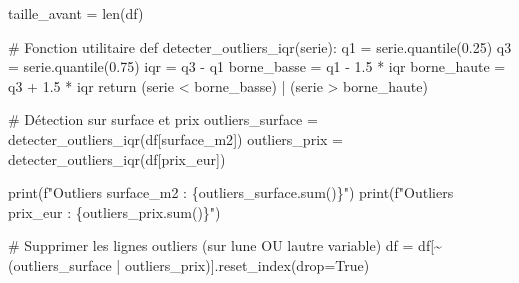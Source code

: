 \documentclass[
  french,
  11pt,
  a4paper,
]{scrbook}
\newenvironment{Shaded}{}{}
\newcommand{\BuiltInTok}[1]{\textcolor[rgb]{0.84,0.23,0.29}{#1}}
\newcommand{\CommentTok}[1]{\textcolor[rgb]{0.42,0.45,0.49}{#1}}
\newcommand{\ControlFlowTok}[1]{\textcolor[rgb]{0.84,0.23,0.29}{#1}}
\newcommand{\FloatTok}[1]{\textcolor[rgb]{0.00,0.36,0.77}{#1}}
\newcommand{\KeywordTok}[1]{\textcolor[rgb]{0.84,0.23,0.29}{#1}}
\newcommand{\NormalTok}[1]{\textcolor[rgb]{0.14,0.16,0.18}{#1}}
\newcommand{\OperatorTok}[1]{\textcolor[rgb]{0.14,0.16,0.18}{#1}}
\newcommand{\SpecialCharTok}[1]{\textcolor[rgb]{0.00,0.36,0.77}{#1}}
\newcommand{\SpecialStringTok}[1]{\textcolor[rgb]{0.01,0.18,0.38}{#1}}
\newcommand{\StringTok}[1]{\textcolor[rgb]{0.01,0.18,0.38}{#1}}
\newcommand{\VariableTok}[1]{\textcolor[rgb]{0.89,0.38,0.04}{#1}}
\begin{document}
\begin{tcolorbox}[enhanced jigsaw, arc=.35mm, bottomrule=.15mm, bottomtitle=1mm, breakable, colback=white, colbacktitle=quarto-callout-tip-color!10!white, colframe=quarto-callout-tip-color-frame, coltitle=black, left=2mm, leftrule=.75mm, opacityback=0, opacitybacktitle=0.6, rightrule=.15mm, title=\textcolor{quarto-callout-tip-color}{\faLightbulb}\hspace{0.5em}{✅ Corrigé Étape 2.4}, titlerule=0mm, toprule=.15mm, toptitle=1mm]

\begin{Shaded}
\begin{Highlighting}[]
\NormalTok{taille\_avant }\OperatorTok{=} \BuiltInTok{len}\NormalTok{(df)}

\CommentTok{\# Fonction utilitaire}
\KeywordTok{def}\NormalTok{ detecter\_outliers\_iqr(serie):}
\NormalTok{    q1 }\OperatorTok{=}\NormalTok{ serie.quantile(}\FloatTok{0.25}\NormalTok{)}
\NormalTok{    q3 }\OperatorTok{=}\NormalTok{ serie.quantile(}\FloatTok{0.75}\NormalTok{)}
\NormalTok{    iqr }\OperatorTok{=}\NormalTok{ q3 }\OperatorTok{{-}}\NormalTok{ q1}
\NormalTok{    borne\_basse }\OperatorTok{=}\NormalTok{ q1 }\OperatorTok{{-}} \FloatTok{1.5} \OperatorTok{*}\NormalTok{ iqr}
\NormalTok{    borne\_haute }\OperatorTok{=}\NormalTok{ q3 }\OperatorTok{+} \FloatTok{1.5} \OperatorTok{*}\NormalTok{ iqr}
    \ControlFlowTok{return}\NormalTok{ (serie }\OperatorTok{\textless{}}\NormalTok{ borne\_basse) }\OperatorTok{|}\NormalTok{ (serie }\OperatorTok{\textgreater{}}\NormalTok{ borne\_haute)}

\CommentTok{\# Détection sur surface et prix}
\NormalTok{outliers\_surface }\OperatorTok{=}\NormalTok{ detecter\_outliers\_iqr(df[}\StringTok{\textquotesingle{}surface\_m2\textquotesingle{}}\NormalTok{])}
\NormalTok{outliers\_prix }\OperatorTok{=}\NormalTok{ detecter\_outliers\_iqr(df[}\StringTok{\textquotesingle{}prix\_eur\textquotesingle{}}\NormalTok{])}

\BuiltInTok{print}\NormalTok{(}\SpecialStringTok{f"Outliers surface\_m2 : }\SpecialCharTok{\{}\NormalTok{outliers\_surface}\SpecialCharTok{.}\BuiltInTok{sum}\NormalTok{()}\SpecialCharTok{\}}\SpecialStringTok{"}\NormalTok{)}
\BuiltInTok{print}\NormalTok{(}\SpecialStringTok{f"Outliers prix\_eur   : }\SpecialCharTok{\{}\NormalTok{outliers\_prix}\SpecialCharTok{.}\BuiltInTok{sum}\NormalTok{()}\SpecialCharTok{\}}\SpecialStringTok{"}\NormalTok{)}

\CommentTok{\# Supprimer les lignes outliers (sur l\textquotesingle{}une OU l\textquotesingle{}autre variable)}
\NormalTok{df }\OperatorTok{=}\NormalTok{ df[}\OperatorTok{\textasciitilde{}}\NormalTok{(outliers\_surface }\OperatorTok{|}\NormalTok{ outliers\_prix)].reset\_index(drop}\OperatorTok{=}\VariableTok{True}\NormalTok{)}


\end{Highlighting}
\end{Shaded}
\end{tcolorbox}
\end{document}
